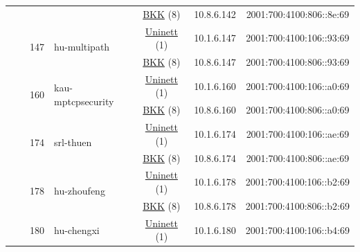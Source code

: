 \begin{small}
\begin{center}
\begin{longtable}{|c|c|c|c|c|c|c|c|}
  &  &  &  & \multicolumn{2}{|c|}{\tiny{\href{http://bkk.no}{BKK} (8)}} & \tiny{10.8.6.142} & \tiny{2001:700:4100:806::8e:69} \\* \cline{3-3}\cline{4-4}\cline{5-5}\cline{6-6}\cline{7-7}\cline{8-8}
  &  & \multirow{2}{*}{\tiny{147}} & \multicolumn{1}{|l|}{\multirow{2}{*}{\tiny{hu-multipath}}} & \multicolumn{2}{|c|}{\tiny{\href{https://www.uninett.no}{Uninett} (1)}} & \tiny{10.1.6.147} & \tiny{2001:700:4100:106::93:69} \\* \cline{5-5}\cline{6-6}\cline{7-7}\cline{8-8}
  &  &  &  & \multicolumn{2}{|c|}{\tiny{\href{http://bkk.no}{BKK} (8)}} & \tiny{10.8.6.147} & \tiny{2001:700:4100:806::93:69} \\* \cline{3-3}\cline{4-4}\cline{5-5}\cline{6-6}\cline{7-7}\cline{8-8}
  &  & \multirow{2}{*}{\tiny{160}} & \multicolumn{1}{|l|}{\multirow{2}{*}{\tiny{kau-mptcpsecurity}}} & \multicolumn{2}{|c|}{\tiny{\href{https://www.uninett.no}{Uninett} (1)}} & \tiny{10.1.6.160} & \tiny{2001:700:4100:106::a0:69} \\* \cline{5-5}\cline{6-6}\cline{7-7}\cline{8-8}
  &  &  &  & \multicolumn{2}{|c|}{\tiny{\href{http://bkk.no}{BKK} (8)}} & \tiny{10.8.6.160} & \tiny{2001:700:4100:806::a0:69} \\* \cline{3-3}\cline{4-4}\cline{5-5}\cline{6-6}\cline{7-7}\cline{8-8}
  &  & \multirow{2}{*}{\tiny{174}} & \multicolumn{1}{|l|}{\multirow{2}{*}{\tiny{srl-thuen}}} & \multicolumn{2}{|c|}{\tiny{\href{https://www.uninett.no}{Uninett} (1)}} & \tiny{10.1.6.174} & \tiny{2001:700:4100:106::ae:69} \\* \cline{5-5}\cline{6-6}\cline{7-7}\cline{8-8}
  &  &  &  & \multicolumn{2}{|c|}{\tiny{\href{http://bkk.no}{BKK} (8)}} & \tiny{10.8.6.174} & \tiny{2001:700:4100:806::ae:69} \\* \cline{3-3}\cline{4-4}\cline{5-5}\cline{6-6}\cline{7-7}\cline{8-8}
  &  & \multirow{2}{*}{\tiny{178}} & \multicolumn{1}{|l|}{\multirow{2}{*}{\tiny{hu-zhoufeng}}} & \multicolumn{2}{|c|}{\tiny{\href{https://www.uninett.no}{Uninett} (1)}} & \tiny{10.1.6.178} & \tiny{2001:700:4100:106::b2:69} \\* \cline{5-5}\cline{6-6}\cline{7-7}\cline{8-8}
  &  &  &  & \multicolumn{2}{|c|}{\tiny{\href{http://bkk.no}{BKK} (8)}} & \tiny{10.8.6.178} & \tiny{2001:700:4100:806::b2:69} \\* \cline{3-3}\cline{4-4}\cline{5-5}\cline{6-6}\cline{7-7}\cline{8-8}
  &  & \multirow{2}{*}{\tiny{180}} & \multicolumn{1}{|l|}{\multirow{2}{*}{\tiny{hu-chengxi}}} & \multicolumn{2}{|c|}{\tiny{\href{https://www.uninett.no}{Uninett} (1)}} & \tiny{10.1.6.180} & \tiny{2001:700:4100:106::b4:69} \\* \cline{5-5}\cline{6-6}\cline{7-7}\cline{8-8}

\end{longtable}
\end{center}
\end{small}
